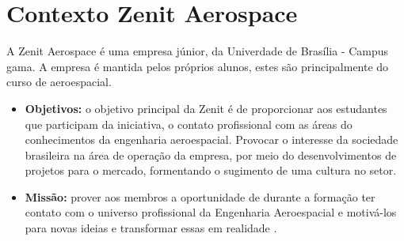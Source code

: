 \chapter[Contexto Zenit Aerospace]{Contexto Zenit Aerospace}
A Zenit Aerospace é uma empresa júnior, da Univerdade de Brasília - Campus gama. A empresa é mantida pelos próprios alunos, estes são principalmente do curso de aeroespacial. 
\begin{itemize}
\item \textbf{Objetivos:} o objetivo principal da Zenit é de proporcionar aos estudantes que participam da iniciativa, o contato profissional com as áreas do conhecimentos da engenharia aeroespacial. Provocar o interesse da sociedade brasileira na área de operação da empresa, por meio do desenvolvimentos de projetos para o mercado, formentando o sugimento de uma cultura no setor. 
\item\textbf{Missão:} prover aos membros a oportunidade de durante a formação ter contato com o universo profissional da Engenharia Aeroespacial e motivá-los para novas ideias e transformar essas em realidade \cite{regimentoZenit}.
\end{itemize}
